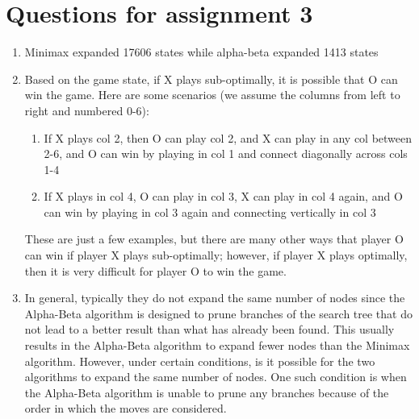 \documentclass[8pt, letterpaper, titlepage]{article}
\title{\textbf{\Huge{ 
\begin{center}
MATE 201\\ \large{Class notes} %
\end{center} 
}}}
\author{Lora Ma}
\begin{document}
\section*{Questions for assignment 3}

\begin{enumerate}
  \item Minimax expanded 17606 states while alpha-beta expanded 1413 states
  \item Based on the game state, if X plays sub-optimally, it is possible that O can win the game. Here are some scenarios (we assume the columns from left to right and numbered 0-6):
  \begin{enumerate}
    \item If X plays col 2, then O can play col 2, and X can play in any col between 2-6, and O can win by playing in col 1 and connect diagonally across cols 1-4
    \item If X plays in col 4, O can play in col 3, X can play in col 4 again, and O can win by playing in col 3 again and connecting vertically in col 3
  \end{enumerate}
  These are just a few examples, but there are many other ways that player O can win if player X plays sub-optimally; however, if player X plays optimally, then it is very difficult for player O to win the game.

  \item In general, typically they do not expand the same number of nodes since the Alpha-Beta algorithm is designed to prune branches of the search tree that do not lead to a better result than what has already been found. This usually results in the Alpha-Beta algorithm to expand fewer nodes than the Minimax algorithm. However, under certain conditions, is it possible for the two algorithms to expand the same number of nodes. One such condition is when the Alpha-Beta algorithm is unable to prune any branches because of the order in which the moves are considered.
\end{enumerate}
\end{document}
